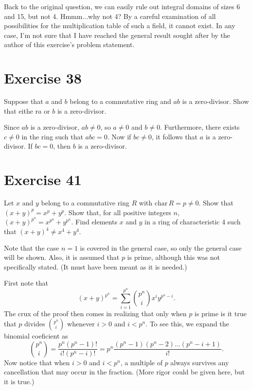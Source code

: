 \documentclass[12pt]{article}
\newcommand{\chr}{\mbox{char}\,}
\begin{document}
Back to the original question, we can easily rule out integral
domains of sizes 6 and 15, but not 4.  Hmmm...why not 4?
By a careful examination of all possibilities for the multiplication
table of such a field, it cannot exist.  In any case, I'm not sure
that I have reached the general result sought after by the
author of this exercise's problem statement.

\section*{Exercise 38}

Suppose that $a$ and $b$ belong to a commutative ring and $ab$
is a zero-divisor.  Show that eithe r$a$ or $b$ is a zero-divisor.

Since $ab$ is a zero-divisor, $ab\neq 0$, so $a\neq 0$ and $b\neq 0$.
Furthermore, there exists $c\neq 0$ in the ring such that $abc=0$.
Now if $bc\neq 0$, it follows that $a$ is a zero-divisor.  If $bc=0$,
then $b$ is a zero-divisor.

\section*{Exercise 41}

Let $x$ and $y$ belong to a commutative ring $R$ with $\chr R=p\neq 0$.
Show that $(x+y)^p=x^p+y^p$.  Show that, for all positive integers $n$,
$(x+y)^{p^n}=x^{p^n}+y^{p^n}$.  Find elements $x$ and $y$ in a ring of
characteristic 4 such that $(x+y)^4\neq x^4+y^4$.

Note that the case $n=1$ is covered in the general case, so only the general
case will be shown.  Also, it is assumed that $p$ is prime, although this was not
specifically stated.  (It must have been meant as it is needed.)

First note that
\begin{equation*}
(x+y)^{p^n}=\sum_{i=1}^{p^n}\binom{p^n}{i}x^iy^{p^n-i}.
\end{equation*}
The crux of the proof then comes in realizing that only when $p$ is prime is it
true that $p$ divides $\binom{p^n}{i}$ whenever $i>0$ and $i<p^n$.
To see this, we expand the binomial coeficient as
\begin{equation*}
\binom{p^n}{i}=\frac{p^n(p^n-1)!}{i!(p^n-i)!}=p^n\frac{(p^n-1)(p^n-2)\dots(p^n-i+1)}{i!}.
\end{equation*}
Now notice that when $i>0$ and $i<p^n$, a multiple of $p$ always
survives any cancellation that may occur in the fraction.  (More rigor could
be given here, but it is true.)
\end{document}
